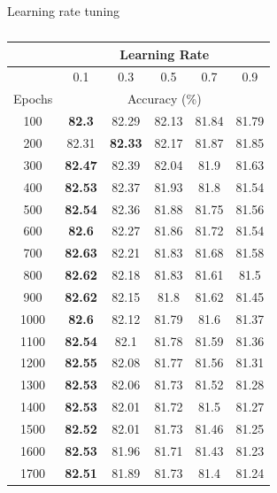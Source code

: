 \documentclass[12pt]{article}
\begin{document}
      \singlespacing
      \begin{table}[H]
        \centering
        \caption{Learning rate tuning}
        \begin{subtable}{.49\linewidth}
          \centering
          \caption{}
          \begin{tabular}{c|ccccc}
            \toprule
                  & \multicolumn{5}{c}{Learning Rate} \\
            \midrule
                  & \multicolumn{1}{c|}{0.1} & \multicolumn{1}{c|}{0.3} & \multicolumn{1}{c|}{0.5} & \multicolumn{1}{c|}{0.7} & 0.9 \\
            \midrule
            Epochs & \multicolumn{5}{c}{Accuracy (\%)} \\
            \midrule
            100   & \textbf{82.3} & 82.29 & 82.13 & 81.84 & 81.79 \\
            200   & 82.31 & \textbf{82.33} & 82.17 & 81.87 & 81.85 \\
            300   & \textbf{82.47} & 82.39 & 82.04 & 81.9  & 81.63 \\
            400   & \textbf{82.53} & 82.37 & 81.93 & 81.8  & 81.54 \\
            500   & \textbf{82.54} & 82.36 & 81.88 & 81.75 & 81.56 \\
            600   & \textbf{82.6} & 82.27 & 81.86 & 81.72 & 81.54 \\
            700   & \textbf{82.63} & 82.21 & 81.83 & 81.68 & 81.58 \\
            800   & \textbf{82.62} & 82.18 & 81.83 & 81.61 & 81.5 \\
            900   & \textbf{82.62} & 82.15 & 81.8  & 81.62 & 81.45 \\
            1000  & \textbf{82.6} & 82.12 & 81.79 & 81.6  & 81.37 \\
            1100  & \textbf{82.54} & 82.1  & 81.78 & 81.59 & 81.36 \\
            1200  & \textbf{82.55} & 82.08 & 81.77 & 81.56 & 81.31 \\
            1300  & \textbf{82.53} & 82.06 & 81.73 & 81.52 & 81.28 \\
            1400  & \textbf{82.53} & 82.01 & 81.72 & 81.5  & 81.27 \\
            1500  & \textbf{82.52} & 82.01 & 81.73 & 81.46 & 81.25 \\
            1600  & \textbf{82.53} & 81.96 & 81.71 & 81.43 & 81.23 \\
            1700  & \textbf{82.51} & 81.89 & 81.73 & 81.4  & 81.24 \\

\end{tabular}
\end{subtable}
\end{table}
\end{document}
